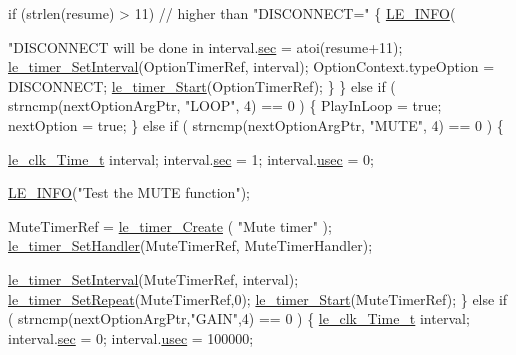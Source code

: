 \begin{DoxyCodeInclude}
{{{{{{{{{{{{{{            \textcolor{keywordflow}{if} (strlen(resume) > 11) \textcolor{comment}{// higher than "DISCONNECT="}
            \{
                \hyperlink{le__log_8h_a23e6d206faa64f612045d688cdde5808}{LE\_INFO}(\textcolor{stringliteral}{"DISCONNECT will be done in %
                interval.\hyperlink{structle__clk___time__t_ae28e527dbd551b3537edc1737611782f}{sec} = atoi(resume+11);
                \hyperlink{le__timer_8h_a0a103d5cef5e83fc9088859d527bbd43}{le\_timer\_SetInterval}(OptionTimerRef, interval);
                OptionContext.typeOption = DISCONNECT;
                \hyperlink{watchdog_8c_a8f0ef9d6af3090467f5a969c799ad25d}{le\_timer\_Start}(OptionTimerRef);
            \}
        \}
        \textcolor{keywordflow}{else} \textcolor{keywordflow}{if} ( strncmp(nextOptionArgPtr, \textcolor{stringliteral}{"LOOP"}, 4) == 0 )
        \{
            PlayInLoop = \textcolor{keyword}{true};
            nextOption = \textcolor{keyword}{true};
        \}
        \textcolor{keywordflow}{else} \textcolor{keywordflow}{if} ( strncmp(nextOptionArgPtr, \textcolor{stringliteral}{"MUTE"}, 4) == 0 )
        \{

            \hyperlink{structle__clk___time__t}{le\_clk\_Time\_t} interval;
            interval.\hyperlink{structle__clk___time__t_ae28e527dbd551b3537edc1737611782f}{sec} = 1;
            interval.\hyperlink{structle__clk___time__t_a8324bdde9199a09a47489a3f246f184c}{usec} = 0;

            \hyperlink{le__log_8h_a23e6d206faa64f612045d688cdde5808}{LE\_INFO}(\textcolor{stringliteral}{"Test the MUTE function"});

            MuteTimerRef = \hyperlink{le__timer_8h_aee41169a210378b369f440cf99146522}{le\_timer\_Create}  ( \textcolor{stringliteral}{"Mute timer"} );
            \hyperlink{update_daemon_8c_ac9249ea73392d7d9ffe947ef6829b551}{le\_timer\_SetHandler}(MuteTimerRef, MuteTimerHandler);

            \hyperlink{le__timer_8h_a0a103d5cef5e83fc9088859d527bbd43}{le\_timer\_SetInterval}(MuteTimerRef, interval);
            \hyperlink{watchdog_8c_aa784fef99700de8ffcb27f49d1145746}{le\_timer\_SetRepeat}(MuteTimerRef,0);
            \hyperlink{watchdog_8c_a8f0ef9d6af3090467f5a969c799ad25d}{le\_timer\_Start}(MuteTimerRef);
        \}
        \textcolor{keywordflow}{else} \textcolor{keywordflow}{if} ( strncmp(nextOptionArgPtr,\textcolor{stringliteral}{"GAIN"},4) == 0 )
        \{
            \hyperlink{structle__clk___time__t}{le\_clk\_Time\_t} interval;
            interval.\hyperlink{structle__clk___time__t_ae28e527dbd551b3537edc1737611782f}{sec} = 0;
            interval.\hyperlink{structle__clk___time__t_a8324bdde9199a09a47489a3f246f184c}{usec} = 100000;

}}}}}}}}}}}}}}}
\end{DoxyCodeInclude}
